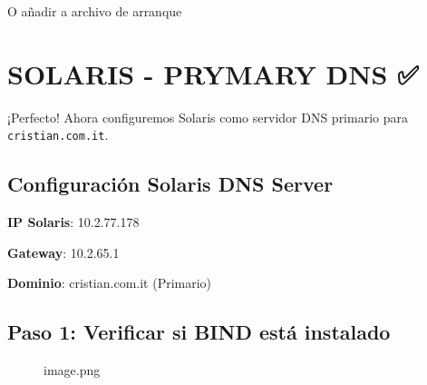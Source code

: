 O añadir a archivo de arranque

\section{SOLARIS - PRYMARY DNS ✅}\label{solaris---prymary-dns}

¡Perfecto! Ahora configuremos Solaris como servidor DNS primario para
\texttt{cristian.com.it}.

\subsection{Configuración Solaris DNS
Server}\label{configuraciuxf3n-solaris-dns-server}

\textbf{IP Solaris}: 10.2.77.178

\textbf{Gateway}: 10.2.65.1

\textbf{Dominio}: cristian.com.it (Primario)

\subsection{Paso 1: Verificar si BIND está
instalado}\label{paso-1-verificar-si-bind-estuxe1-instalado}

\begin{Shaded}
\begin{Highlighting}[]
\end{Highlighting}
\end{Shaded}

\begin{figure}
\centering
{}
\caption{image.png}
\end{figure}

